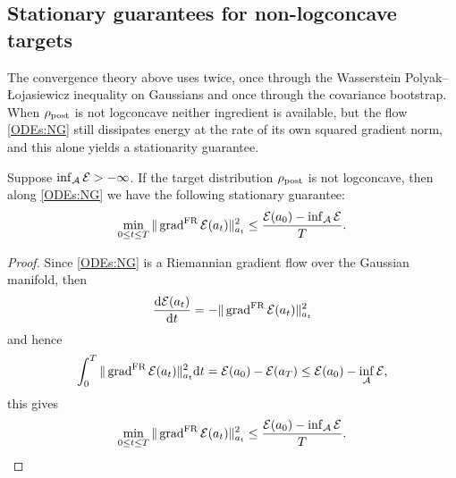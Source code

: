 \subsection{Stationary guarantees for non-logconcave targets}

The convergence theory above uses  twice, once through the Wasserstein Polyak--{\L}ojasiewicz inequality on Gaussians and once through the covariance bootstrap. When $\rho_{\mathrm{post}}$ is not logconcave neither ingredient is available, but the flow \eqref{ODEs:NG} still dissipates energy at the rate of its own squared gradient norm, and this alone yields a stationarity guarantee.

\begin{corollary}\label{cor:stationary-cont}
    Suppose $\inf_{\mathcal{A}} \mathcal{E} > -\infty$. If the target distribution $\rho_{\mathrm{post}}$ is not logconcave, then along \eqref{ODEs:NG} we have the following stationary guarantee:
    \begin{equation*}
        \min_{0 \le t \le T} \| \operatorname{grad}^{\mathrm{FR}} \mathcal{E} (a_t) \|_{a_t}^2 \le \frac{\mathcal{E} (a_0) - \inf_{\mathcal{A}} \mathcal{E}}{T}.
    \end{equation*}
\end{corollary}

\begin{proof}
    Since \eqref{ODEs:NG} is a Riemannian gradient flow over the Gaussian manifold, then
    \begin{equation*}
        \frac{\mathrm{d} \mathcal{E} (a_t)}{\mathrm{d} t} = - \| \operatorname{grad}^{\mathrm{FR}} \mathcal{E} (a_t) \|_{a_t}^2
    \end{equation*}
    and hence
    \begin{equation*}
        \int_0^T \| \operatorname{grad}^{\mathrm{FR}} \mathcal{E} (a_t) \|_{a_t}^2 \mathrm{d} t = \mathcal{E} (a_0) - \mathcal{E} (a_T) \leq \mathcal{E} (a_0) - \inf_{\mathcal{A}} \mathcal{E},
    \end{equation*}
    this gives
    \begin{equation*}
        \min_{0 \le t \le T} \| \operatorname{grad}^{\mathrm{FR}} \mathcal{E} (a_t) \|_{a_t}^2 \le \frac{\mathcal{E} (a_0) - \inf_{\mathcal{A}} \mathcal{E}}{T}.
    \end{equation*}
\end{proof}

